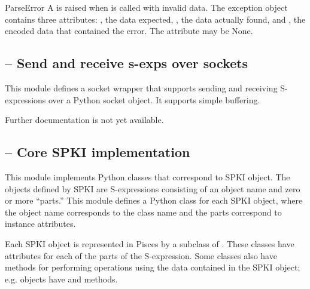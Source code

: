 \documentclass{howto}
\begin{document}
\begin{excdesc}{ParseError}
A  is raised when  is called
with invalid data.  The exception object contains three attributes: 
, the data expected, , the data actually
found, and , the encoded data that contained the error.
The  attribute may be None.
\end{excdesc}

\subsection{
	-- Send and receive s-exps over sockets}

This module defines a socket wrapper  that supports
sending and receiving S-expressions over a Python socket object.  It
supports simple buffering.

Further documentation is not yet available.

\subsection{
	-- Core SPKI implementation}

This module implements Python classes that correspond to SPKI object.
The objects defined by SPKI are S-expressions consisting of an object
name and zero or more ``parts.''  This module defines a Python class
for each SPKI object, where the object name corresponds to the class
name and the parts correspond to instance attributes.

Each SPKI object is represented in Pisces by a subclass of
.  These classes have attributes for each of the
parts of the S-expression.  Some classes also have methods for performing
operations using the data contained in the SPKI object;
e.g.  objects have  and
 methods.
\end{document}

